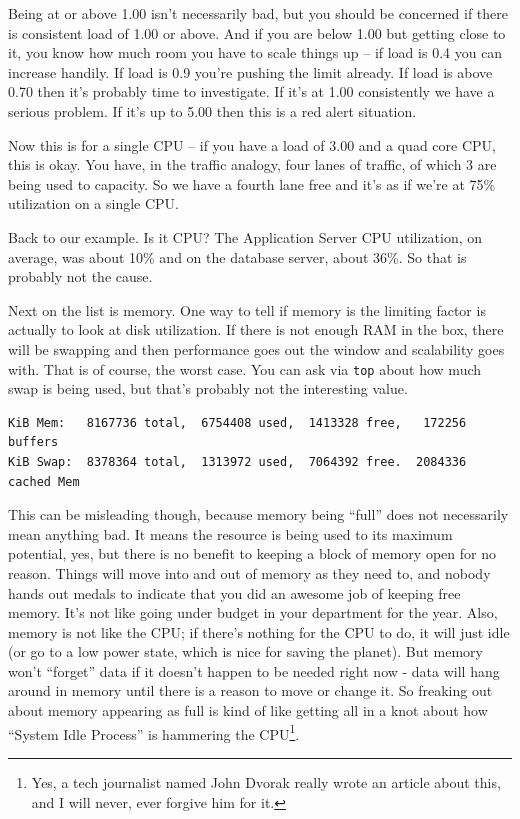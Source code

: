 \documentclass[a4paper]{report}
\begin{document}
Being at or above 1.00 isn't necessarily bad, but you should be concerned if there is consistent load of 1.00 or above. And if you are below 1.00 but getting close to it, you know how much room you have to scale things up -- if load is 0.4 you can increase handily. If load is 0.9 you're pushing the limit already. If load is above 0.70 then it's probably time to investigate. If it's at 1.00 consistently we have a serious problem. If it's up to 5.00 then this is a red alert situation.

Now this is for a single CPU -- if you have a load of 3.00 and a quad core CPU, this is okay. You have, in the traffic analogy, four lanes of traffic, of which 3 are being used to capacity. So we have a fourth lane free and it's as if we're at 75\% utilization on a single CPU.


Back to our example. Is it CPU? The Application Server CPU utilization, on average, was about 10\% and on the database server, about 36\%. So that is probably not the cause. 

Next on the list is memory. One way to tell if memory is the limiting factor is actually to look at disk utilization. If there is not enough RAM in the box, there will be swapping and then performance goes out the window and scalability goes with. That is of course, the worst case. You can ask via \texttt{top} about how much swap is being used, but that's probably not the interesting value. 

\begin{verbatim}
KiB Mem:   8167736 total,  6754408 used,  1413328 free,   172256 buffers
KiB Swap:  8378364 total,  1313972 used,  7064392 free.  2084336 cached Mem
\end{verbatim}

This can be misleading though, because memory being ``full'' does not necessarily mean anything bad. It means the resource is being used to its maximum potential, yes, but there is no benefit to keeping a block of memory open for no reason. Things will move into and out of memory as they need to, and nobody hands out medals to indicate that you did an awesome job of keeping free memory. It's not like going under budget in your department for the year.  Also, memory is not like the CPU; if there's nothing for the CPU to do, it will just idle (or go to a low power state, which is nice for saving the planet). But memory won't ``forget'' data if it doesn't happen to be needed right now - data will hang around in memory until there is a reason to move or change it. So freaking out about memory appearing as full is kind of like getting all in a knot about how ``System Idle Process'' is hammering the CPU\footnote{Yes, a tech journalist named John Dvorak really wrote an article about this, and I will never, ever forgive him for it.}.
\end{document}

